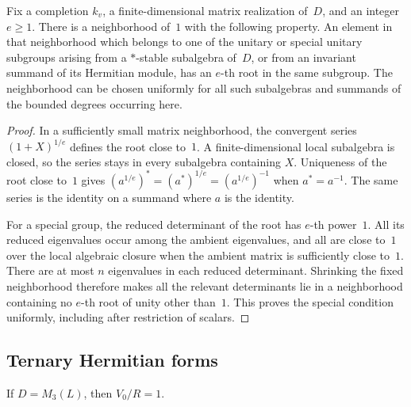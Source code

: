 \begin{lemma}\label{lem:unitary-uniform-roots}
Fix a completion $k_v$, a finite-dimensional matrix realization of~$D$,
and an integer $e\geq1$.  There is a neighborhood of~$1$ with the
following property.  An element in that neighborhood which belongs to
one of the unitary or special unitary subgroups arising from a
$*$-stable subalgebra of~$D$, or from an invariant summand of its
Hermitian module, has an $e$-th root in the same subgroup.  The
neighborhood can be chosen uniformly for all such subalgebras and
summands of the bounded degrees occurring here.
\end{lemma}

\begin{proof}
In a sufficiently small matrix neighborhood, the convergent series
$(1+X)^{1/e}$ defines the root close to~$1$.  A finite-dimensional local
subalgebra is closed, so the series stays in every subalgebra containing
$X$.  Uniqueness of the root close to~$1$ gives
$(a^{1/e})^*=(a^*)^{1/e}=(a^{1/e})^{-1}$ when $a^*=a^{-1}$.
The same series is the identity on a summand where $a$ is the identity.

For a special group, the reduced determinant of the root has $e$-th
power~$1$.  All its reduced eigenvalues occur among the ambient
eigenvalues, and all are close to~$1$ over the local algebraic closure
when the ambient matrix is sufficiently close to~$1$.  There are at
most $n$ eigenvalues in each reduced determinant.  Shrinking the fixed
neighborhood therefore makes all the relevant determinants lie in a
neighborhood containing no $e$-th root of unity other than~$1$.  This
proves the special condition uniformly, including after restriction of
scalars.
\end{proof}

\subsection{Ternary Hermitian forms}

\begin{proposition}\label{prop:unitary-ternary}
If $D=M_3(L)$, then $V_0/R=1$.
\end{proposition}

